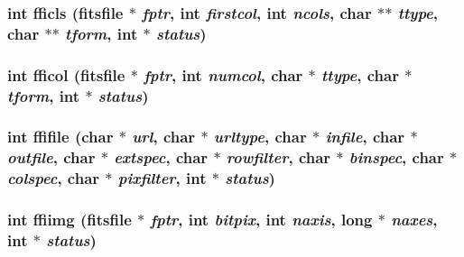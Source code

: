 \subsubsection{\setlength{\rightskip}{0pt plus 5cm}int fficls (\bf{fitsfile} $\ast$ {\em fptr}, int {\em firstcol}, int {\em ncols}, char $\ast$$\ast$ {\em ttype}, char $\ast$$\ast$ {\em tform}, int $\ast$ {\em status})}\label{test_2shm__client_2fitsio_8h_cd1a0072dd0c525e2263eb781403f1eb}


\subsubsection{\setlength{\rightskip}{0pt plus 5cm}int fficol (\bf{fitsfile} $\ast$ {\em fptr}, int {\em numcol}, char $\ast$ {\em ttype}, char $\ast$ {\em tform}, int $\ast$ {\em status})}\label{test_2shm__client_2fitsio_8h_bbf8d6634ce0e3a4c6446730f4fae58a}


\subsubsection{\setlength{\rightskip}{0pt plus 5cm}int ffifile (char $\ast$ {\em url}, char $\ast$ {\em urltype}, char $\ast$ {\em infile}, char $\ast$ {\em outfile}, char $\ast$ {\em extspec}, char $\ast$ {\em rowfilter}, char $\ast$ {\em binspec}, char $\ast$ {\em colspec}, char $\ast$ {\em pixfilter}, int $\ast$ {\em status})}\label{test_2shm__client_2fitsio_8h_a145a043753a554e3f743ee431fc65d6}


\subsubsection{\setlength{\rightskip}{0pt plus 5cm}int ffiimg (\bf{fitsfile} $\ast$ {\em fptr}, int {\em bitpix}, int {\em naxis}, long $\ast$ {\em naxes}, int $\ast$ {\em status})}\label{test_2shm__client_2fitsio_8h_bdfe7ce055dc6e2df14de16381703b35}


